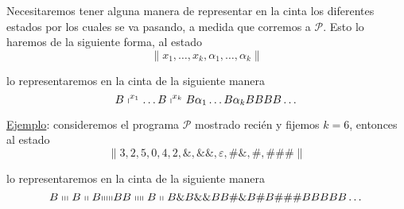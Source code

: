 \begin{frame}
	\PN Necesitaremos tener alguna manera de representar en la cinta los diferentes estados por los cuales se va pasando,
	a medida que corremos a $\mathcal{P}$. Esto lo haremos de la siguiente forma, al estado
	\begin{equation*}
		\lVert x_{1}, \dotsc, x_{k}, \alpha_{1}, \dotsc, \alpha_{k} \rVert
	\end{equation*}

	\PN lo representaremos en la cinta de la siguiente manera
	\begin{equation*}
		B \shortmid^{x_{1}} \dotsc B \shortmid^{x_{k}} B \alpha_{1} \dotsc B \alpha_{k} BBBB \dotsc
	\end{equation*}

	\PN \underline{Ejemplo}: consideremos el programa $\mathcal{P}$ mostrado recién y fijemos $k=6$, entonces al estado
	\begin{equation*}
		\lVert 3, 2, 5, 0, 4, 2, \&, \&\&, \varepsilon, \#\&, \#, \#\#\# \rVert
	\end{equation*}

	\PN lo representaremos en la cinta de la siguiente manera
	\begin{equation*}
		B \shortmid \shortmid \shortmid B \shortmid \shortmid B\mathrm{\shortmid \shortmid \shortmid \shortmid \shortmid}
		BB \shortmid \shortmid \shortmid \shortmid B \shortmid \shortmid B \& B \&\& BB \#\& B \# B \#\#\# BBBBB \dotsc
	\end{equation*}
\end{frame}
